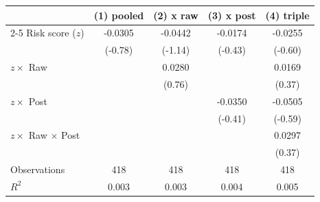 \begin{tabular}{lcccc}
\toprule
& \multicolumn{1}{c}{(1) pooled} & \multicolumn{1}{c}{(2) x raw} & \multicolumn{1}{c}{(3) x post} & \multicolumn{1}{c}{(4) triple} \\
\cmidrule(lr){2-5}
Risk score ($z$) & -0.0305 & -0.0442 & -0.0174 & -0.0255 \\
 & (-0.78) & (-1.14) & (-0.43) & (-0.60) \\[2pt]
$z\times$ Raw &  & 0.0280 &  & 0.0169 \\
 &  & (0.76) &  & (0.37) \\[2pt]
$z\times$ Post &  &  & -0.0350 & -0.0505 \\
 &  &  & (-0.41) & (-0.59) \\[2pt]
$z\times$ Raw $\times$ Post &  &  &  & 0.0297 \\
 &  &  &  & (0.37) \\[2pt]
\midrule
Observations & 418 & 418 & 418 & 418 \\
$R^2$ & 0.003 & 0.003 & 0.004 & 0.005 \\
\bottomrule
\end{tabular}